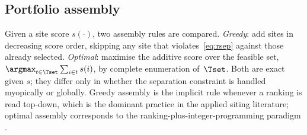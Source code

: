 \subsection{Portfolio assembly}

Given a site score $s(\cdot)$, two assembly rules are compared.
\emph{Greedy}: add sites in decreasing score order, skipping any site
that violates~\eqref{eq:rsep} against those already selected.
\emph{Optimal}: maximise the additive score over the feasible set,
$\argmax_{t\in\Tset}\sum_{i\in t}s(i)$, by complete enumeration
of~$\Tset$.
Both are exact given $s$; they differ only in whether the separation
constraint is handled myopically or globally.
Greedy assembly is the implicit rule whenever a ranking is read top-down,
which is the dominant practice in the applied siting literature; optimal
assembly corresponds to the ranking-plus-integer-programming paradigm
\citep{BransMareschal1992,Mavrotas2006,VetscheraDeAlmeida2012}.
